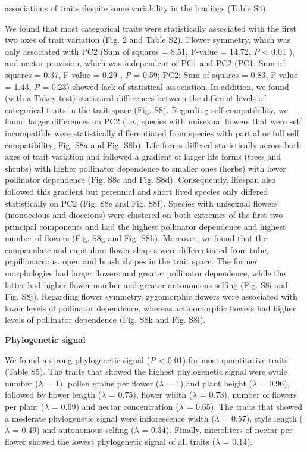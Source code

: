 \documentclass[
  12pt,
  a4paper,
]{article}
\begin{document}
associations of traits despite some variability in the loadings (Table S4).

We found that most categorical traits were statistically associated with the first two axes of trait variation (Fig. 2 and Table S2). Flower symmetry, which was only associated with PC2 (Sum of squares = 8.51, F-value = 14.72, \emph{P} \textless{} 0.01 ), and nectar provision, which was independent of PC1 and PC2 (PC1: Sum of squares = 0.37, F-value = 0.29 , \emph{P} = 0.59; PC2: Sum of squares = 0.83, F-value = 1.43, \emph{P} = 0.23) showed lack of statistical association. In addition, we found (with a Tukey test) statistical differences between the different levels of categorical traits in the trait space (Fig. S8). Regarding self compatibility, we found larger differences on PC2 (i.e., species with unisexual flowers that were self incompatible were statistically differentiated from species with partial or full self compatibility; Fig. S8a and Fig. S8b). Life forms differed statistically across both axes of trait variation and followed a gradient of larger life forms (trees and shrubs) with higher pollinator dependence to smaller ones (herbs) with lower pollinator dependence (Fig. S8c and Fig. S8d). Consequently, lifespan also followed this gradient but perennial and short lived species only differed statistically on PC2 (Fig. S8e and Fig. S8f). Species with unisexual flowers (monoecious and dioecious) were clustered on both extremes of the first two principal components and had the highest pollinator dependence and highest number of flowers (Fig. S8g and Fig. S8h). Moreover, we found that the campanulate and capitulum flower shapes were differentiated from tube, papilionaceous, open and brush shapes in the trait space. The former morphologies had larger flowers and greater pollinator dependence, while the latter had higher flower number and greater autonomous selfing (Fig. S8i and Fig. S8j). Regarding flower symmetry, zygomorphic flowers were associated with lower levels of pollinator dependence, whereas actinomorphic flowers had higher levels of pollinator dependence (Fig. S8k and Fig. S8l).

\textbf{Phylogenetic signal}

We found a strong phylogenetic signal (\emph{P} \textless{} 0.01) for most quantitative traits (Table S5). The traits that showed the highest phylogenetic signal were ovule number (\(\lambda\) = 1), pollen grains per flower (\(\lambda\) = 1) and plant height (\(\lambda\) = 0.96), followed by flower length (\(\lambda\) = 0.75), flower width (\(\lambda\) = 0.73), number of flowers per plant (\(\lambda\) = 0.69) and nectar concentration (\(\lambda\) = 0.65). The traits that showed a moderate phylogenetic signal were inflorescence width (\(\lambda\) = 0.57), style length (\(\lambda\) = 0.49) and autonomous selfing (\(\lambda\) = 0.34). Finally, microliters of nectar per flower showed the lowest phylogenetic signal of all traits (\(\lambda\) = 0.14).
\end{document}
